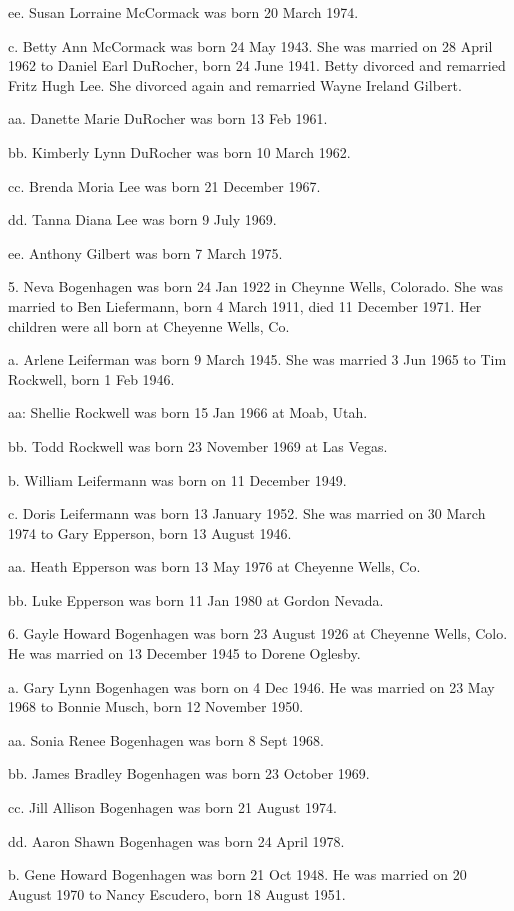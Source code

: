 \documentclass[a4paper]{article}
\begin{document}
ee. Susan Lorraine McCormack was born 20 March 1974.

c. Betty Ann McCormack was born 24 May 1943.  She was married on 28 April 1962 to Daniel Earl DuRocher, born 24 June 1941.  Betty divorced and remarried Fritz Hugh Lee. She divorced again and remarried Wayne Ireland Gilbert. 

aa. Danette Marie DuRocher was born 13 Feb 1961.

bb. Kimberly Lynn DuRocher was born 10 March 1962.

cc. Brenda Moria Lee was born 21 December 1967.

dd. Tanna Diana Lee was born 9 July 1969.

ee. Anthony Gilbert was born 7 March 1975.

5. Neva Bogenhagen was born 24 Jan 1922 in Cheynne Wells, Colorado.  She was married to Ben Liefermann, born 4 March 1911, died 11 December 1971. Her children were all born at Cheyenne Wells, Co.

a. Arlene Leiferman was born 9 March 1945.  She was married 3 Jun 1965 to Tim Rockwell, born 1 Feb 1946.

aa: Shellie Rockwell was born 15 Jan 1966 at Moab, Utah.

bb. Todd Rockwell was born 23 November 1969 at Las Vegas.

b. William Leifermann was born on 11 December 1949.

c. Doris Leifermann was born 13 January 1952.  She was married on 30 March 1974 to Gary Epperson, born 13 August 1946. 

aa. Heath Epperson was born 13 May 1976 at Cheyenne Wells, Co.

bb. Luke Epperson was born 11 Jan 1980 at Gordon Nevada.

6. Gayle Howard Bogenhagen was born 23 August 1926 at Cheyenne Wells, Colo.  He was married on 13 December 1945 to Dorene Oglesby. 

a. Gary Lynn Bogenhagen was born on 4 Dec 1946. He was married on  23 May 1968 to Bonnie Musch, born 12 November 1950. 

aa. Sonia Renee Bogenhagen was born 8 Sept 1968.

bb. James Bradley Bogenhagen was born 23 October 1969. 

cc. Jill Allison Bogenhagen was born 21 August 1974.

dd. Aaron Shawn Bogenhagen was born 24 April 1978.
			
b. Gene Howard Bogenhagen was born 21 Oct 1948.  He was married on 20 August 1970 to Nancy Escudero, born 18 August 1951.
\end{document}
